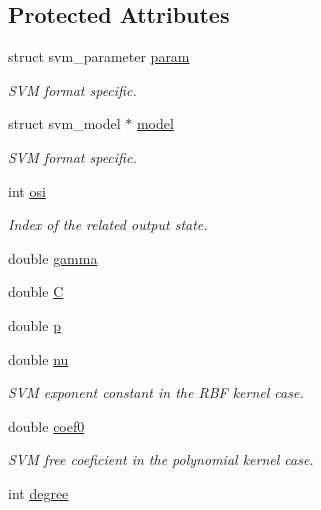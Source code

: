 \subsection*{Protected Attributes}
\begin{DoxyCompactItemize}
\item 
struct svm\-\_\-parameter \hyperlink{class_go_s_u_m_1_1_c_single_a_m_a3ef521484ddcef46a6a1da104fb0bf87}{param}
\begin{DoxyCompactList}\small\item\em S\-V\-M format specific. \end{DoxyCompactList}\item 
struct svm\-\_\-model $\ast$ \hyperlink{class_go_s_u_m_1_1_c_single_a_m_a512f4020c768225334ba3bcab462be10}{model}
\begin{DoxyCompactList}\small\item\em S\-V\-M format specific. \end{DoxyCompactList}\item 
int \hyperlink{class_go_s_u_m_1_1_c_single_a_m_a55a31b8751445b942790f395f89a00ea}{osi}
\begin{DoxyCompactList}\small\item\em Index of the related output state. \end{DoxyCompactList}\item 
double \hyperlink{class_go_s_u_m_1_1_c_single_a_m_a78163361ed0edb048f97cd382b9014e5}{gamma}
\item 
double \hyperlink{class_go_s_u_m_1_1_c_single_a_m_aaa0eba4efdd26680f66cbc04e6a9633a}{C}
\item 
double \hyperlink{class_go_s_u_m_1_1_c_single_a_m_a2151ace8d1a5b99355bbf1ee8db0278c}{p}
\item 
double \hyperlink{class_go_s_u_m_1_1_c_single_a_m_a6af8bb4fec805a9f936bcfee61049238}{nu}
\begin{DoxyCompactList}\small\item\em S\-V\-M exponent constant in the R\-B\-F kernel case. \end{DoxyCompactList}\item 
double \hyperlink{class_go_s_u_m_1_1_c_single_a_m_af741aaa733aec6ac97d405d39d60f3ab}{coef0}
\begin{DoxyCompactList}\small\item\em S\-V\-M free coeficient in the polynomial kernel case. \end{DoxyCompactList}\item 
int \hyperlink{class_go_s_u_m_1_1_c_single_a_m_a1b4eabb824c41f19f9679472e29c2602}{degree}

\end{DoxyCompactItemize}
